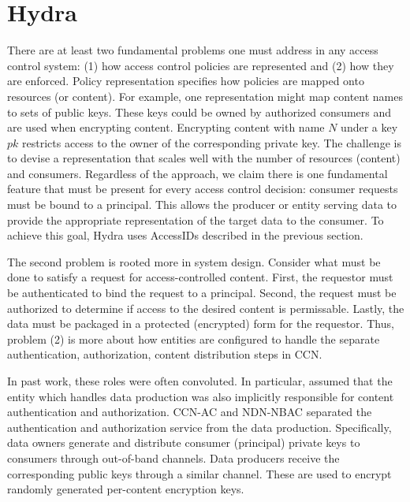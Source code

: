 \section{Hydra}

\nocite{adams1995hitchhiker}


There are at least two fundamental problems one must address in any access control
system: (1) how access control policies are represented and (2) how they are enforced.
Policy representation specifies how policies are mapped onto resources (or content).
For example, one representation might map content names to sets of public keys. These
keys could be owned by authorized consumers and are used when encrypting content.
Encrypting content with name $N$ under a key $pk$ restricts access to the owner of
the corresponding private key. The challenge is to devise a representation that
scales well with the number of resources (content) and consumers. Regardless of
the approach, we claim there is one fundamental feature that must be present for
every access control decision: consumer requests must be bound to a principal.
This allows the producer or entity serving data to provide the appropriate
representation of the target data to the consumer. To achieve this goal, Hydra
uses AccessIDs described in the previous section.

The second problem is rooted more in system design. Consider what must be done
to satisfy a request for access-controlled content. First, the requestor must
be authenticated to bind the request to a principal. Second, the request must
be authorized to determine if access to the desired content is permissable. Lastly,
the data must be packaged in a protected (encrypted) form for the requestor. Thus,
problem (2) is more about how entities are configured to handle the separate
authentication, authorization, content distribution steps in CCN.

In past work, these roles were often convoluted. In particular, \cite{pre,be}
assumed that the entity which handles data production was also implicitly
responsible for content authentication and authorization. CCN-AC \cite{xx} and
NDN-NBAC \cite{xx} separated the authentication and authorization service from
the data production. Specifically, data owners generate and distribute consumer (principal)
private keys to consumers through out-of-band channels. Data producers receive
the corresponding public keys through a similar channel. These are used to encrypt
randomly generated per-content encryption keys.

